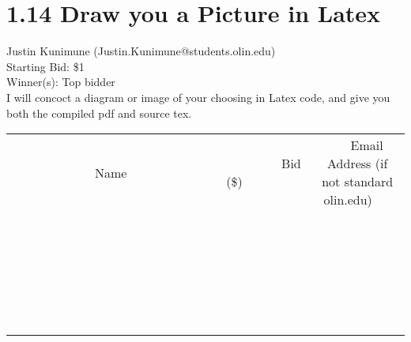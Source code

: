\documentclass[11pt]{article}
\begin{document}
\section*{1.14 Draw you a Picture in Latex}
Justin Kunimune (Justin.Kunimune@students.olin.edu) \\
Starting Bid: \$1 \\
Winner(s): 
Top bidder \\
I will concoct a diagram or image of your choosing in Latex code, and give you both the compiled pdf and source tex. \\[6ex]
\begin{tabular}{c c c}
~~~~~~~~~~~~~Name~~~~~~~~~~~~~ & ~~~~~~~~~Bid (\$)~~~~~~~~~ & ~~~Email Address (if not standard olin.edu)~~~ \\
 & & \\
\hline
 & & \\
\hline
 & & \\
\hline
 & & \\
\hline
 & & \\
\hline
 & & \\
\hline
 & & \\
\hline
 & & \\
\hline
 & & \\
\hline
 & & \\
\hline
 & & \\
\hline
 & & \\
\hline
 & & \\
\hline
 & & \\
\hline
 & & \\
\hline
 & & \\
\hline
 & & \\
\hline
 & & \\
\hline
 & & \\
\hline
 & & \\
\hline
 & & \\
\hline
 & & \\
\hline
 & & \\
\hline
 & & \\
\hline
 & & \\
\hline
 & & \\
\hline
\end{tabular}
\clearpage
\end{document}
